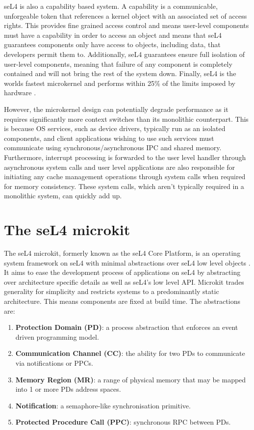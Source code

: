 seL4 is also a capability based system. A capability is a communicable, unforgeable token that 
references a kernel object with an associated set of access rights. This provides fine grained access control
and means user-level components must have a capability in order to access an object and means that seL4
guarantees components only have access to objects, including data, that developers permit them to.
Additionally, seL4 guarantees ensure full isolation of user-level components, meaning that
failure of any component is completely contained and will not bring the rest of the system down. 
Finally, seL4 is the worlds fastest microkernel and performs within 25\%
of the limits imposed by hardware \cite{Mi_LYWC_19}. 

However, the microkernel design can potentially degrade performance as it requires
significantly more context switches than its monolithic counterpart. This is because OS services,
such as device drivers, typically run as an isolated components, and client
applications wishing to use such services must communicate using synchronous/asynchronous
IPC and shared memory. Furthermore, interrupt processing is forwarded to the user level handler
through asynchronous system calls and user level applications are also responsible for initiating
any cache management operations through system calls when required
for memory consistency. These system calls, which aren't typically required in a monolithic
system, can quickly add up. 

\section{The seL4 microkit}
The seL4 microkit, formerly known as the seL4 Core Platform,
is an operating system framework on seL4 with minimal abstractions over seL4 low level
objects \cite{Heiser_PCVL_22}. It aims to ease the development process of applications on seL4 by abstracting over
architecture specific details as well as seL4's low level API. Microkit trades generality for simplicity and 
restricts systems to a predominantly static architecture. This means components are fixed at build time. 
The abstractions are:
\begin{enumerate}
    \item \textbf{Protection Domain (PD)}: a process abstraction that enforces an event driven programming model.
    \item \textbf{Communication Channel (CC)}: the ability for two PDs to communicate via notifications or PPCs.
    \item \textbf{Memory Region (MR)}: a range of physical memory that may be mapped into 1 or more PDs address spaces. 
    \item \textbf{Notification}: a semaphore-like synchronisation primitive. 
    \item \textbf{Protected Procedure Call (PPC)}: synchronous RPC between PDs. 
\end{enumerate}

